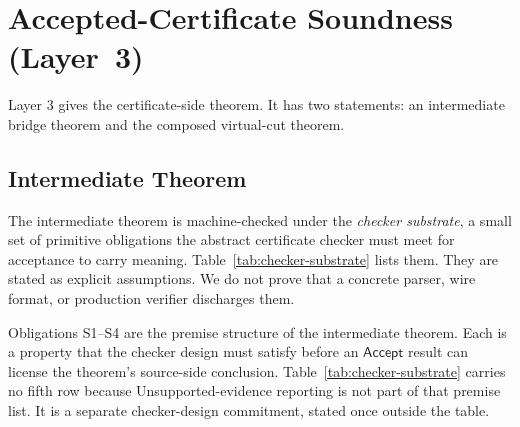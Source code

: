 \documentclass[letterpaper,10pt,twocolumn]{article}
\newcommand{\Accept}{\mathsf{Accept}}
\begin{document}
\section{Accepted-Certificate Soundness \mbox{(Layer 3)}}\label{accepted-certificate-soundness-layer-3}

Layer 3 gives the certificate-side theorem. It has two statements: an
intermediate bridge theorem and the composed virtual-cut theorem.

\subsection{Intermediate Theorem}\label{intermediate-theorem}

The intermediate theorem is machine-checked under the \emph{checker
substrate}, a small set of primitive obligations the abstract
certificate checker must meet for acceptance to carry meaning.
Table~\ref{tab:checker-substrate} lists them. They are stated as
explicit assumptions. We do not prove that a concrete parser, wire
format, or production verifier discharges them.

\begin{table}[t]
\caption{Checker-substrate obligations S1--S4 for the
accepted-certificate intermediate theorem.}
\label{tab:checker-substrate}
\centering\small
{}
\end{table}

Obligations S1--S4 are the premise structure of the intermediate
theorem. Each is a property that the checker design must satisfy before
an $\Accept$ result can license the theorem's source-side conclusion.
Table~\ref{tab:checker-substrate} carries no fifth row because
Unsupported-evidence reporting is not part of that premise list. It is
a separate checker-design commitment, stated once outside the
table.
\end{document}
